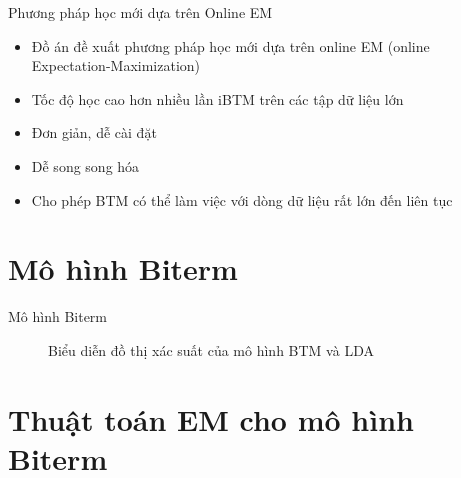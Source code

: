 \documentclass[pdf]{beamer}
\begin{document}
\begin{frame}{Phương pháp học mới dựa trên Online EM}
	\begin{itemize}
		\item Đồ án đề xuất phương pháp học mới dựa trên online EM (online Expectation-Maximization)
		\item Tốc độ học cao hơn nhiều lần iBTM trên các tập dữ liệu lớn
		\item Đơn giản, dễ cài đặt 
		\item Dễ song song hóa
		\item Cho phép BTM có thể làm việc với dòng dữ liệu rất lớn đến liên tục
	\end{itemize}
\end{frame}

\section{Mô hình Biterm}

\begin{frame}{Mô hình Biterm}
	\begin{figure}[H]
		\centering
		\caption{Biểu diễn đồ thị xác suất của mô hình BTM và LDA}
		\label{fig:BTM+LDA}
	\end{figure}
\end{frame}


\section{Thuật toán EM cho mô hình Biterm}
\end{document}
